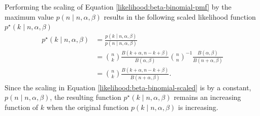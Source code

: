 \documentclass[officiallayout]{tktla}
\begin{document}
Performing the scaling of Equation \eqref{likelihood:beta-binomial-pmf}
by the maximum value $p\left(n \middle| n, \alpha, \beta\right)$
results in the following scaled likelihood function $p^{\star}\left(k
\middle| n, \alpha, \beta\right)$
\begin{equation}
  \label{likelihood:beta-binomial-scaled}
  \begin{aligned}
    p^{\star}\left(k \middle| n, \alpha, \beta\right) &= \frac{p\left(k \middle| n, \alpha, \beta\right)}{p\left(n \middle| n, \alpha, \beta\right)} \\
    &= \binom{n}{k}\frac{B\left(k + \alpha, n - k + \beta\right)}{B\left(\alpha, \beta\right)} \binom{n}{n}^{-1}\frac{B\left(\alpha, \beta\right)}{B\left(n + \alpha, \beta\right)} \\
    &= \binom{n}{k}\frac{B\left(k + \alpha, n - k + \beta\right)}{B\left(n + \alpha, \beta\right)}.
  \end{aligned}
\end{equation}
Since the scaling in Equation \eqref{likelihood:beta-binomial-scaled} is
by a constant, $p\left(n \middle| n, \alpha, \beta\right)$, the
resulting function $p^{\star}\left(k \middle| n, \alpha, \beta\right)$
remains an increasing function of $k$ when the original function
$p\left(k \middle| n, \alpha, \beta\right)$ is increasing.

\end{document}
